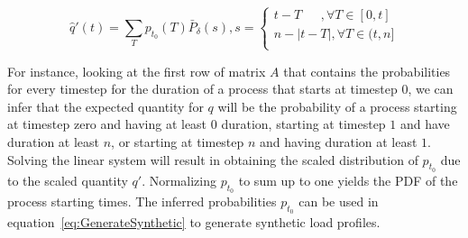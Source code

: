 \documentclass[conference]{IEEEtran}
\begin{document}
\begin{small}
\begin{equation}\label{eq:infer_t_0_axis}
\hat{q}'(t) = \sum_{T} p_{t_0}(T) \bar{P}_{\delta} (s), s =
\left\lbrace
\begin{array}{l}
 t-T~~~~~~~,\forall T \in [0, t]\\
 n-|t-T|,\forall T \in (t, n]\\
\end{array}
\right.
\end{equation}
\end{small}For instance, looking at the first row of matrix $A$ that contains the probabilities for every timestep for the duration of a process that starts at timestep $0$, we can infer that the expected quantity for $q$ will be the probability of a process starting at timestep zero and having at least $0$ duration, starting at timestep $1$ and have duration at least $n$, or starting at timestep $n$ and having duration at least $1$. Solving the linear system will result in obtaining the scaled distribution of $p_{t_0}$ due to the scaled quantity $q'$. Normalizing $p_{t_0}$ to sum up to one yields the PDF of the process starting times. The inferred probabilities $p_{t_0}$ can be used in equation~\eqref{eq:GenerateSynthetic} to generate synthetic load profiles. 


%
%
%
 
\end{document}
